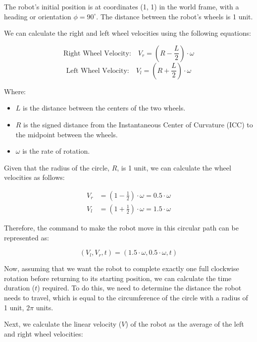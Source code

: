 \documentclass[answers]{exam}
\begin{document}
\begin{questions}
\begin{parts}
\begin{solution}
            The robot's initial position is at coordinates (1, 1) in the world frame, with
            a heading or orientation \(\phi = 90^\circ\). The distance between the robot's
            wheels is 1 unit.

            We can calculate the right and left wheel velocities using the following
            equations:

            \[\text{Right Wheel Velocity:} \quad V_r = (R - \frac{L}{2}) \cdot \omega\]
            \[\text{Left Wheel Velocity:} \quad V_l = (R + \frac{L}{2}) \cdot \omega\]

            Where:
            \begin{itemize}
                \item \(L\) is the distance between the centers of the two wheels.
                \item \(R\) is the signed distance from the Instantaneous Center of Curvature (ICC) to the midpoint between the wheels.
                \item \(\omega\) is the rate of rotation.
            \end{itemize}

            Given that the radius of the circle, \(R\), is 1 unit, we can calculate the
            wheel velocities as follows:

            \begin{align*}
                V_r & = (1 - \frac{1}{2}) \cdot \omega = 0.5 \cdot \omega \\
                V_l & = (1 + \frac{1}{2}) \cdot \omega = 1.5 \cdot \omega
            \end{align*}

            Therefore, the command to make the robot move in this circular path can be
            represented as:

            \[(V_l, V_r, t) = (1.5\cdot\omega, 0.5\cdot\omega, t)\]

            Now, assuming that we want the robot to complete exactly one full clockwise
            rotation before returning to its starting position, we can calculate the time
            duration (\(t\)) required. To do this, we need to determine the distance the
            robot needs to travel, which is equal to the circumference of the circle with a
            radius of 1 unit, \(2\pi\) units.

            Next, we calculate the linear velocity (\(V\)) of the robot as the average of
            the left and right wheel velocities:


\end{solution}
\end{parts}
\end{questions}
\end{document}
